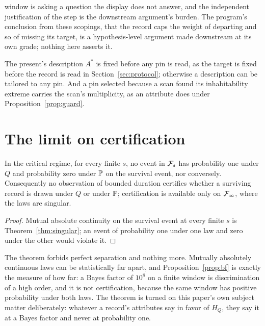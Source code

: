 \begin{remark}
window is asking a question the display does not answer, and the
independent justification of the step is the downstream argument's
burden. The program's conclusion from
these scopings, that the record caps the weight of departing and so of
missing its target, is a hypothesis-level argument made downstream at
its own grade; nothing here asserts it.
\end{remark}

\begin{remark}\label{rem:scopeprotocol}
The present's description $A^\ast$ is fixed before any pin is read, as
the target is fixed before the record is read in
Section~\ref{sec:protocol}; otherwise a description can be tailored to
any pin. And a pin selected because a scan found its inhabitability
extreme carries the scan's multiplicity, as an attribute does under
Proposition~\ref{prop:guard}.
\end{remark}

\section{The limit on certification}\label{sec:ceiling}

\begin{theorem}\label{thm:ceiling}
In the critical regime, for every finite $s$, no event in $\mathcal{F}_s$ has
probability one under $Q$ and probability zero under $\mathbb{P}$ on the
survival event, nor conversely. Consequently no observation of bounded
duration certifies whether a surviving record is drawn under $Q$ or under
$\mathbb{P}$; certification is available only on $\mathcal{F}_\infty$, where the laws are
singular.
\end{theorem}

\begin{proof}
Mutual absolute continuity on the survival event at every finite $s$ is
Theorem~\ref{thm:singular}; an event of probability one under one law and
zero under the other would violate it.
\end{proof}

\begin{remark}\label{rem:certify}
The theorem forbids perfect separation and nothing more. Mutually
absolutely continuous laws can be statistically far apart, and
Proposition~\ref{prop:bf} is exactly the measure of how far: a Bayes
factor of $10^{8}$ on a finite window is discrimination of a high order,
and it is not certification, because the same window has positive
probability under both laws. The theorem is turned on this paper's own
subject matter deliberately: whatever a record's attributes say in favor
of $H_Q$, they say it at a Bayes factor and never at probability one.
\end{remark}

